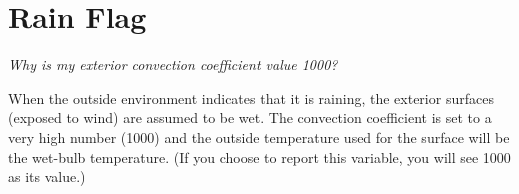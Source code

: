 \section{Rain Flag}\label{rain-flag}

\emph{Why is my exterior convection coefficient value 1000?}

When the outside environment indicates that it is raining, the exterior surfaces (exposed to wind) are assumed to be wet. The convection coefficient is set to a very high number (1000) and the outside temperature used for the surface will be the wet-bulb temperature. (If you choose to report this variable, you will see 1000 as its value.)

